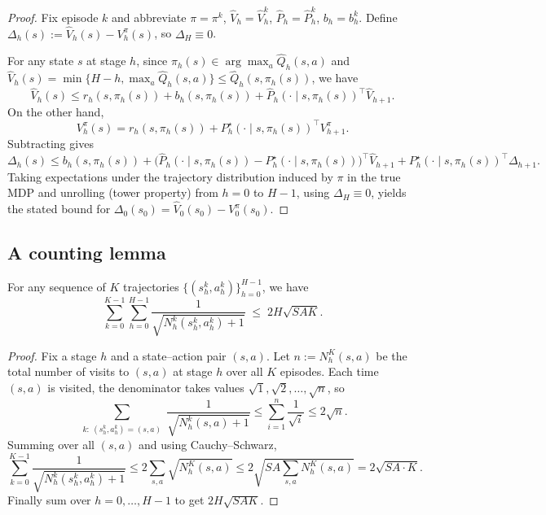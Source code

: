 \begin{proof}
Fix episode $k$ and abbreviate $\pi=\pi^k$, $\widehat V_h=\widehat V_h^k$, $\widehat P_h=\widehat P_h^k$, $b_h=b_h^k$.
Define $\Delta_h(s):=\widehat V_h(s)-V_h^\pi(s)$, so $\Delta_H\equiv 0$.

For any state $s$ at stage $h$, since $\pi_h(s)\in\arg\max_a \widehat Q_h(s,a)$ and
$\widehat V_h(s)=\min\{H-h,\max_a \widehat Q_h(s,a)\}\le \widehat Q_h(s,\pi_h(s))$, we have
\[
\widehat V_h(s)
\le
r_h(s,\pi_h(s)) + b_h(s,\pi_h(s)) + \widehat P_h(\cdot\mid s,\pi_h(s))^\top \widehat V_{h+1}.
\]
On the other hand,
\[
V_h^\pi(s) = r_h(s,\pi_h(s)) + P_h^\star(\cdot\mid s,\pi_h(s))^\top V_{h+1}^\pi.
\]
Subtracting gives
\[
\Delta_h(s)
\le
b_h(s,\pi_h(s))
+ \big(\widehat P_h(\cdot\mid s,\pi_h(s)) - P_h^\star(\cdot\mid s,\pi_h(s))\big)^\top \widehat V_{h+1}
+ P_h^\star(\cdot\mid s,\pi_h(s))^\top \Delta_{h+1}.
\]
Taking expectations under the trajectory distribution induced by $\pi$ in the true MDP
and unrolling (tower property) from $h=0$ to $H-1$, using $\Delta_H\equiv 0$,
yields the stated bound for $\Delta_0(s_0)=\widehat V_0(s_0)-V_0^\pi(s_0)$.
\end{proof}

\subsection{A counting lemma}

\begin{lemma}
\label{lem:ucbvi_counting}
For any sequence of $K$ trajectories $\{(s_h^k,a_h^k)\}_{h=0}^{H-1}$, we have
\[
\sum_{k=0}^{K-1}\sum_{h=0}^{H-1}\frac{1}{\sqrt{N_h^k(s_h^k,a_h^k)+1}}
\;\le\;
2H\sqrt{SAK}.
\]
\end{lemma}

\begin{proof}
Fix a stage $h$ and a state--action pair $(s,a)$. Let $n:=N_h^K(s,a)$ be the total number of visits to $(s,a)$ at stage $h$ over all $K$ episodes.
Each time $(s,a)$ is visited, the denominator takes values $\sqrt{1},\sqrt{2},\dots,\sqrt{n}$, so
\[
\sum_{\substack{k:\ (s_h^k,a_h^k)=(s,a)}}\frac{1}{\sqrt{N_h^k(s,a)+1}}
\le \sum_{i=1}^{n}\frac{1}{\sqrt{i}} \le 2\sqrt{n}.
\]
Summing over all $(s,a)$ and using Cauchy--Schwarz,
\[
\sum_{k=0}^{K-1}\frac{1}{\sqrt{N_h^k(s_h^k,a_h^k)+1}}
\le
2\sum_{s,a}\sqrt{N_h^K(s,a)}
\le
2\sqrt{SA\sum_{s,a}N_h^K(s,a)}
=
2\sqrt{SA\cdot K}.
\]
Finally sum over $h=0,\dots,H-1$ to get $2H\sqrt{SAK}$.
\end{proof}

